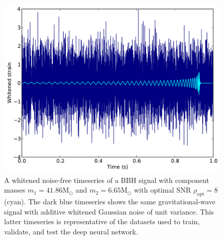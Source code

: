 \documentclass[%
showpacs,
 amsmath,amssymb,
 aps,
 twocolumn,
 prl,
 reprint,
floatfix,
]{revtex4-1}
\newcommand{\optsnr}{\rho_{\mathrm{opt}}}
\begin{document}
\begin{figure} 
\includegraphics[width=\columnwidth]{figures/waveform.pdf}
\caption{A whitened noise-free timeseries of a \ac{BBH} signal with component
masses $m_{1}=41.86\mathrm{M}_{\odot}$ and $m_{2}=6.65\mathrm{M}_{\odot}$ with
optimal \ac{SNR} $\optsnr=8$ (cyan). The dark blue timeseries shows the same
gravitational-wave signal with additive whitened Gaussian noise of unit
variance. This latter timeseries is representative of the datasets used to
train, validate, and test the deep neural network.\label{fig:waveform}}
\end{figure}
\end{document}
